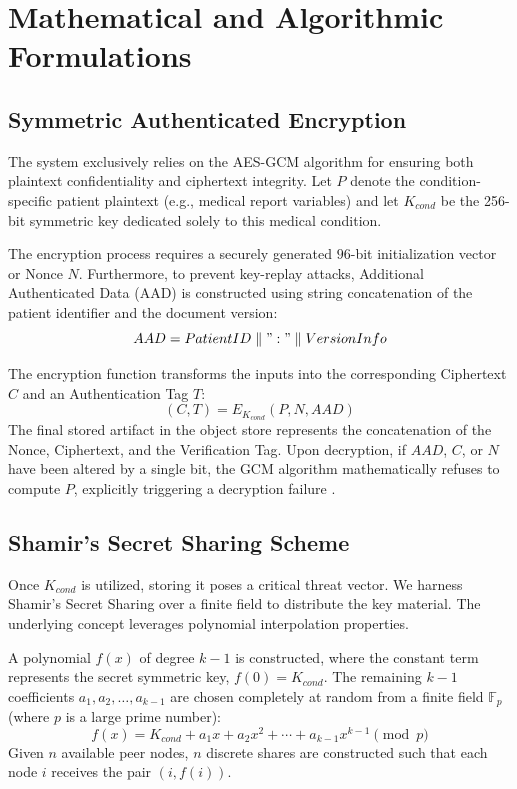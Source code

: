 \chapter{Mathematical and Algorithmic Formulations}

\section{Symmetric Authenticated Encryption}
The system exclusively relies on the AES-GCM algorithm for ensuring both plaintext confidentiality and ciphertext integrity. Let $P$ denote the condition-specific patient plaintext (e.g., medical report variables) and let $K_{cond}$ be the 256-bit symmetric key dedicated solely to this medical condition.

The encryption process requires a securely generated $96$-bit initialization vector or Nonce $N$. Furthermore, to prevent key-replay attacks, Additional Authenticated Data (AAD) is constructed using string concatenation of the patient identifier and the document version:
\begin{equation}
AAD = PatientID \parallel ":" \parallel VersionInfo
\end{equation}

The encryption function transforms the inputs into the corresponding Ciphertext $C$ and an Authentication Tag $T$:
\begin{equation}
(C, T) = E_{K_{cond}}(P, N, AAD)
\end{equation}
The final stored artifact in the object store represents the concatenation of the Nonce, Ciphertext, and the Verification Tag. Upon decryption, if $AAD$, $C$, or $N$ have been altered by a single bit, the GCM algorithm mathematically refuses to compute $P$, explicitly triggering a decryption failure \cite{guan2017distributed}.

\section{Shamir's Secret Sharing Scheme}
Once $K_{cond}$ is utilized, storing it poses a critical threat vector. We harness Shamir's Secret Sharing over a finite field to distribute the key material. The underlying concept leverages polynomial interpolation properties.

A polynomial $f(x)$ of degree $k-1$ is constructed, where the constant term represents the secret symmetric key, $f(0) = K_{cond}$. The remaining $k-1$ coefficients $a_1, a_2, \ldots, a_{k-1}$ are chosen completely at random from a finite field $\mathbb{F}_p$ (where $p$ is a large prime number):
\begin{equation}
f(x) = K_{cond} + a_1 x + a_2 x ^ 2 + \cdots + a_{k-1} x ^ {k-1} \pmod p
\end{equation}
Given $n$ available peer nodes, $n$ discrete shares are constructed such that each node $i$ receives the pair $(i, f(i))$. 

